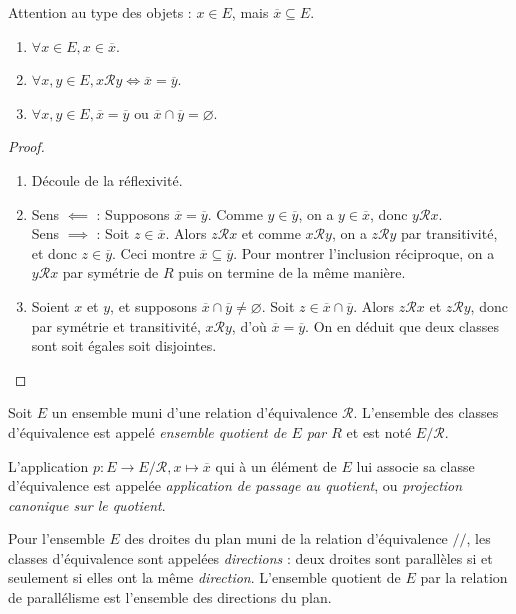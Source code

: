 Attention au type des objets : $x \in E$, mais $\overline{x} \subseteq E$.

\begin{proposition}
\begin{enumerate}
\item $\forall x\in E, x\in \overline{x}$.
\item $\forall x, y\in E, x{\mathcal R}y \iff \overline{x}=\overline{y}$.
\item $\forall x, y\in E, \overline{x} = \overline{y} \text{ ou } \overline{x}\cap \overline{y}=\varnothing$.
\end{enumerate}
\end{proposition}
\begin{proof}
\begin{enumerate}
\item Découle de la réflexivité.
\item Sens $\impliedby$ : Supposons $\overline{x}=\overline{y}$. Comme $y\in \overline{y}$, on a $y\in \overline{x}$, donc $y{\mathcal R}x$.\\
Sens $\implies$ : Soit $z\in \overline{x}$. Alors $z{\mathcal R}x$ et comme $x{\mathcal R}y$, on a $z{\mathcal R}y$ par transitivité, et donc $z\in \overline{y}$. Ceci montre $\overline{x}\subseteq \overline{y}$. Pour montrer l'inclusion réciproque, on a $y{\mathcal R}x$ par symétrie de $R$ puis on termine de la même manière.
\item Soient $x$ et $y$, et supposons $\overline{x}\cap \overline{y} \neq \varnothing$. Soit $z\in \overline{x}\cap \overline{y}$. Alors $z\mathcal R x$ et $z\mathcal R y$, donc par symétrie et transitivité, $x\mathcal R y$, d'où $\overline{x}=\overline{y}$. On en déduit que deux classes sont soit égales soit disjointes.
\end{enumerate}
\end{proof}

\begin{definition}
Soit $E$ un ensemble muni d'une relation d'équivalence ${\mathcal R}$.
L'ensemble des classes d'équivalence est appelé \emph{ensemble quotient de $E$ par $R$} et est noté $E/{\mathcal R}$.

L'application $p : E \to E/\mathcal R, x\mapsto \overline{x}$ qui à un élément de $E$ lui associe sa classe d'équivalence est appelée \emph{application de passage au quotient}, ou \emph{projection canonique sur le quotient}.
\end{definition}

\begin{exemple}
Pour l'ensemble $E$ des droites du plan muni de la relation d'équivalence $//$, les classes d'équivalence sont appelées \emph{directions} : deux droites sont parallèles si et seulement si elles ont la même \emph{direction}. L'ensemble quotient de $E$ par la relation de parallélisme est l'ensemble des directions du plan.
\end{exemple}

